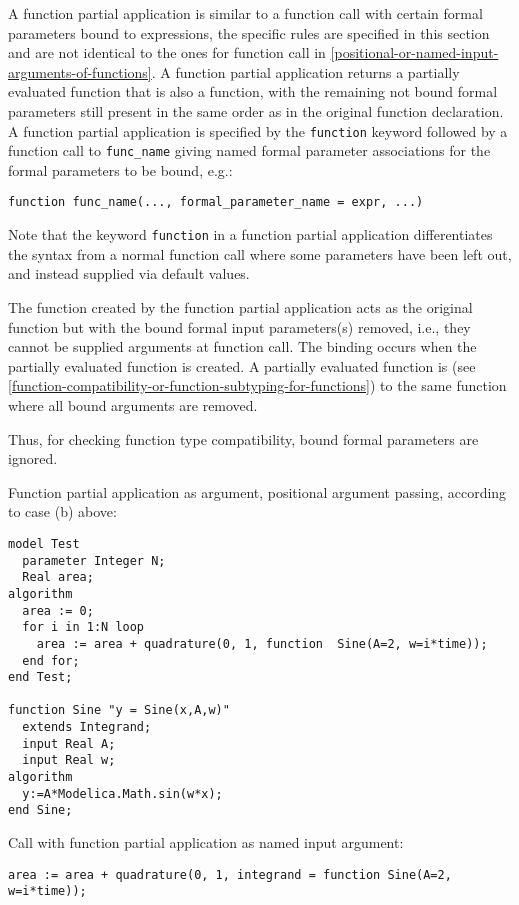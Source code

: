 A function partial application is similar to a function call with
certain formal parameters bound to expressions, the specific rules are
specified in this section and are not identical to the ones for function
call in \cref{positional-or-named-input-arguments-of-functions}. A function partial application returns a partially
evaluated function that is also a function, with the remaining not bound
formal parameters still present in the same order as in the original
function declaration. A function partial application is specified by the
\lstinline!function! keyword followed by a function call to \lstinline!func_name!
giving named formal parameter associations for the formal parameters to
be bound, e.g.:
\begin{lstlisting}[language=modelica]
function func_name(..., formal_parameter_name = expr, ...)
\end{lstlisting}

\begin{nonnormative}
Note that the keyword \lstinline!function! in a function partial
application differentiates the syntax from a normal function call
where some parameters have been left out, and instead supplied via
default values.
\end{nonnormative}

The function created by the function partial application acts as the
original function but with the bound formal input parameters(s) removed,
i.e., they cannot be supplied arguments at function call. The binding
occurs when the partially evaluated function is created. A partially
evaluated function is  (see \cref{function-compatibility-or-function-subtyping-for-functions}) to the
same function where all bound arguments are removed.

\begin{nonnormative}
Thus, for checking function type compatibility, bound formal parameters are ignored.
\end{nonnormative}

\begin{example}
Function partial application as argument, positional argument passing, according to case (b) above:
\begin{lstlisting}[language=modelica]
model Test
  parameter Integer N;
  Real area;
algorithm
  area := 0;
  for i in 1:N loop
    area := area + quadrature(0, 1, function  Sine(A=2, w=i*time));
  end for;
end Test;

function Sine "y = Sine(x,A,w)"
  extends Integrand;
  input Real A;
  input Real w;
algorithm
  y:=A*Modelica.Math.sin(w*x);
end Sine;
\end{lstlisting}
Call with function partial application as named input argument:
\begin{lstlisting}[language=modelica]
area := area + quadrature(0, 1, integrand = function Sine(A=2, w=i*time));
\end{lstlisting}
\end{example}


